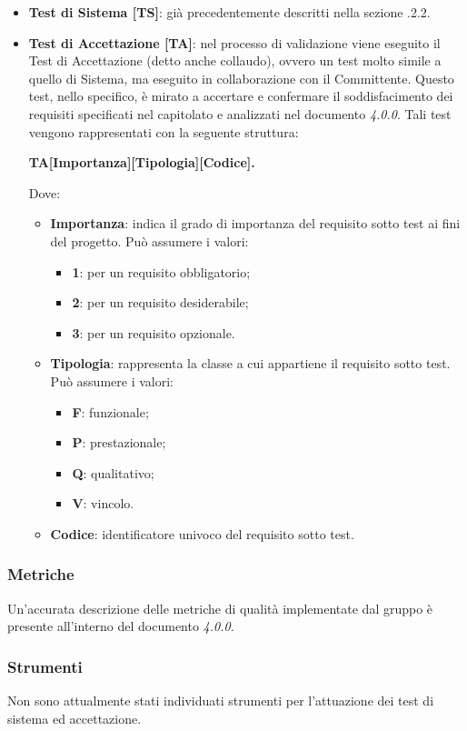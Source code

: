       \begin{itemize}
      \item \textbf{Test di Sistema [TS]}: già precedentemente descritti nella sezione .2.2.
      \item \textbf{Test di Accettazione [TA]}: nel processo di validazione viene eseguito il Test di Accettazione (detto anche collaudo), ovvero un test molto simile a quello di Sistema, ma eseguito in collaborazione con il Committente. Questo test, nello specifico, è mirato a accertare e confermare il soddisfacimento dei requisiti specificati nel capitolato e analizzati nel documento \AdR{} \textit{4.0.0}. Tali test vengono rappresentati con la seguente struttura: \\
      \begin{center}
      	\textbf{TA[Importanza][Tipologia][Codice].}
      \end{center}     
      Dove:
      \begin{itemize}
      	\item{\textbf{Importanza}: indica il grado di importanza del requisito sotto test ai fini del progetto. Può assumere i valori:}
      	\begin{itemize}
      		\item{\textbf{1}: per un requisito obbligatorio;}
      		\item{\textbf{2}: per un requisito desiderabile;}
      		\item{\textbf{3}: per un requisito opzionale.}
      	\end{itemize}
      	
      	\item{\textbf{Tipologia}: rappresenta la classe a cui appartiene il requisito sotto test. Può assumere i valori:}
      	\begin{itemize}
      		\item{\textbf{F}: funzionale;}
      		\item{\textbf{P}: prestazionale;}
      		\item{\textbf{Q}: qualitativo;}
      		\item{\textbf{V}: vincolo.}
      	\end{itemize}
      	
      	\item{\textbf{Codice}: identificatore univoco del requisito sotto test}.
      \end{itemize}
 	\end{itemize}
 
    \subsubsection{Metriche}
    Un'accurata descrizione delle metriche di qualità implementate dal gruppo è presente all'interno del documento \PdQ{} \textit{4.0.0}.
    
    \subsubsection{Strumenti}
    Non sono attualmente stati individuati strumenti per l'attuazione dei test di sistema ed accettazione.
